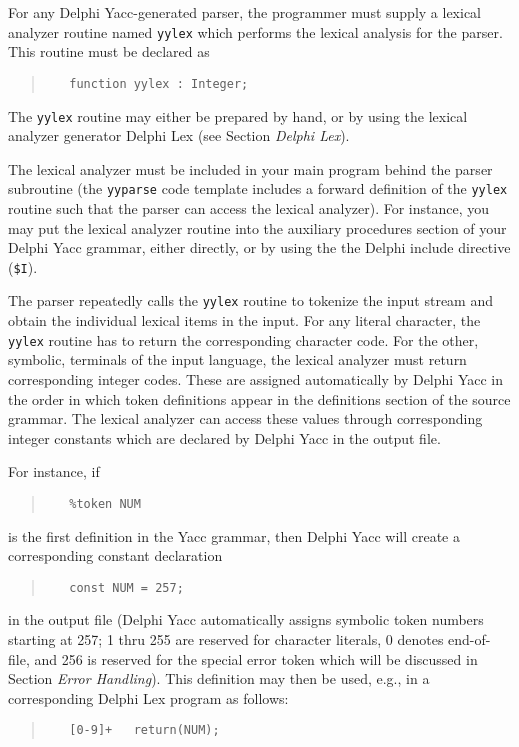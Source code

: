 \documentclass[a4paper]{article}
\begin{document}
For any Delphi Yacc-generated parser, the programmer must supply a lexical
analyzer routine named \verb"yylex" which performs the lexical analysis for
the parser. This routine must be declared as

\begin{quote}\begin{verbatim}
   function yylex : Integer;
\end{verbatim}\end{quote}

The \verb"yylex" routine may either be prepared by hand, or by using the
lexical analyzer generator Delphi Lex (see Section {\em Delphi Lex\/}).

The lexical analyzer must be included in your main program behind the
parser subroutine (the \verb"yyparse" code template includes a forward
definition of the \verb"yylex" routine such that the parser can access the
lexical analyzer). For instance, you may put the lexical analyzer
routine into the auxiliary procedures section of your Delphi Yacc grammar,
either directly, or by using the the Delphi include directive
(\verb"$I").

The parser repeatedly calls the \verb"yylex" routine to tokenize the input
stream and obtain the individual lexical items in the input. For any
literal character, the \verb"yylex" routine has to return the corresponding
character code. For the other, symbolic, terminals of the input language,
the lexical analyzer must return corresponding integer codes. These are
assigned automatically by Delphi Yacc in the order in which token definitions
appear in the definitions section of the source grammar. The lexical
analyzer can access these values through corresponding integer constants
which are declared by Delphi Yacc in the output file.

For instance, if
\begin{quote}\begin{verbatim}
   %token NUM
\end{verbatim}\end{quote}
is the first definition in the Yacc grammar, then Delphi Yacc will create
a corresponding constant declaration
\begin{quote}\begin{verbatim}
   const NUM = 257;
\end{verbatim}\end{quote}
in the output file (Delphi Yacc automatically assigns symbolic token numbers
starting at 257; 1 thru 255 are reserved for character literals, 0 denotes
end-of-file, and 256 is reserved for the special error token which will be
discussed in Section {\em Error Handling\/}). This definition may then be
used, e.g., in a corresponding Delphi Lex program as follows:
\begin{quote}\begin{verbatim}
   [0-9]+   return(NUM);
\end{verbatim}\end{quote}
\end{document}
